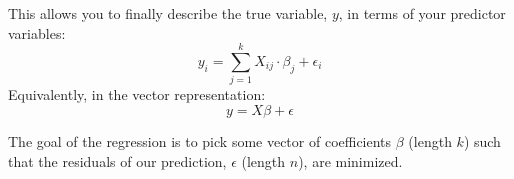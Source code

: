 This allows you to finally describe the true variable, $y$, in terms
of your predictor variables:
\begin{equation}
  y_i = \sum_{j = 1}^{k}X_{ij}\cdot \beta_{j} + \epsilon_{i}
\end{equation}
Equivalently, in the vector representation:
\begin{equation}
  y = X\beta + \epsilon
\end{equation}

The goal of the regression is to pick some vector of coefficients $\beta$ (length $k$)
such that the residuals of our prediction, $\epsilon$ (length $n$), are minimized.
